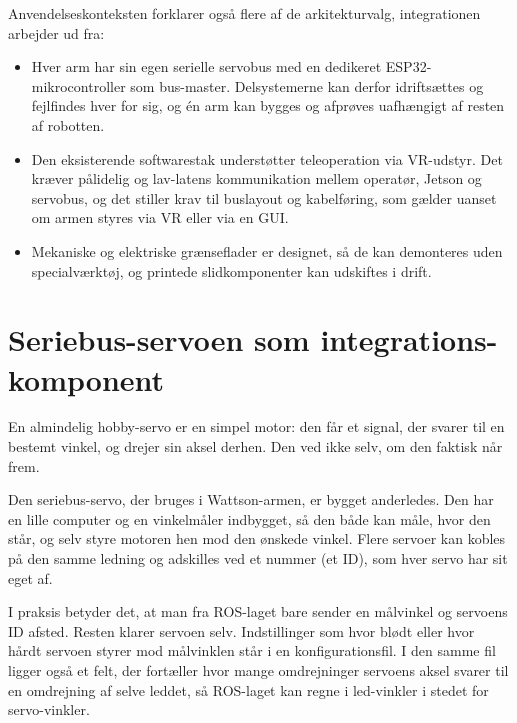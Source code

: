 Anvendelseskonteksten forklarer også flere af de arkitekturvalg,
integrationen arbejder ud fra:

\begin{itemize}
    \item Hver arm har sin egen serielle servobus med en dedikeret
          ESP32-mikrocontroller som bus-master. Delsystemerne kan
          derfor idriftsættes og fejlfindes hver for sig, og én arm
          kan bygges og afprøves uafhængigt af resten af robotten.
    \item Den eksisterende softwarestak understøtter teleoperation
          via VR-udstyr. Det kræver pålidelig og lav-latens
          kommunikation mellem operatør, Jetson og servobus, og det
          stiller krav til buslayout og kabelføring, som gælder
          uanset om armen styres via VR eller via en GUI.
    \item Mekaniske og elektriske grænseflader er designet, så de
          kan demonteres uden specialværktøj, og printede
          slidkomponenter kan udskiftes i drift.
\end{itemize}


\clearpage
\section{Seriebus-servoen som integrations-komponent}
\label{sec:teori-servo}

En almindelig hobby-servo er en simpel motor: den får et signal,
der svarer til en bestemt vinkel, og drejer sin aksel derhen. Den
ved ikke selv, om den faktisk når frem.

Den seriebus-servo, der bruges i Wattson-armen, er bygget
anderledes. Den har en lille computer og en vinkelmåler indbygget,
så den både kan måle, hvor den står, og selv styre motoren hen mod
den ønskede vinkel. Flere servoer kan kobles på den samme ledning
og adskilles ved et nummer (et ID), som hver servo har sit eget
af.

I praksis betyder det, at man fra ROS-laget bare sender en
målvinkel og servoens ID afsted. Resten klarer servoen selv.
Indstillinger som hvor blødt eller hvor hårdt servoen styrer mod
målvinklen står i en konfigurationsfil. I den samme fil ligger
også et felt, der fortæller hvor mange omdrejninger servoens aksel
svarer til en omdrejning af selve leddet, så ROS-laget kan regne i
led-vinkler i stedet for servo-vinkler.

